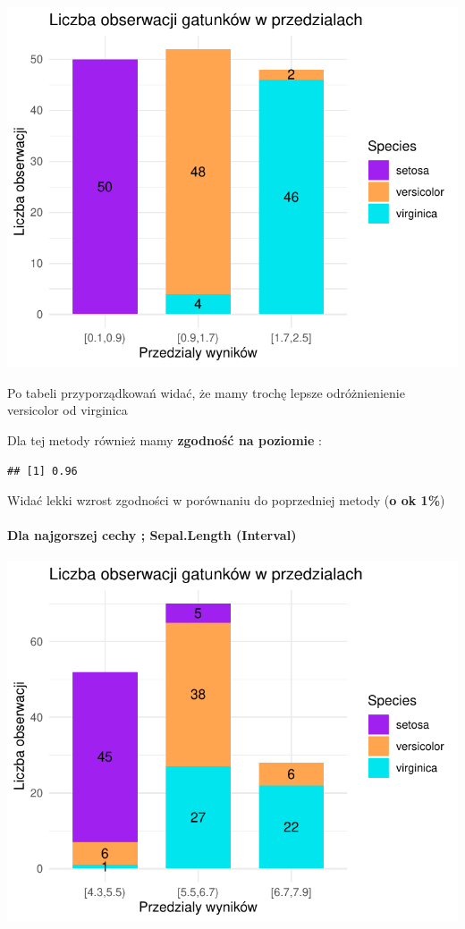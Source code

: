 \documentclass[
  12pt,
]{article}
\begin{document}
\begin{center}\includegraphics{Sprawozdanie2_files/figure-latex/tabela_kondygnacji_2_najl-1} \end{center}

Po tabeli przyporządkowań widać, że mamy trochę lepsze odróżnienienie
versicolor od virginica

Dla tej metody również mamy \textbf{zgodność na poziomie} :

\begin{verbatim}
## [1] 0.96
\end{verbatim}

Widać lekki wzrost zgodności w porównaniu do poprzedniej metody
(\textbf{o ok 1\%})

\paragraph{Dla najgorszej cechy ; Sepal.Length
(Interval)}\label{dla-najgorszej-cechy-sepal.length-interval}

\begin{center}\includegraphics{Sprawozdanie2_files/figure-latex/tabela_kondygnacji_2_najg-1} \end{center}
\end{document}
